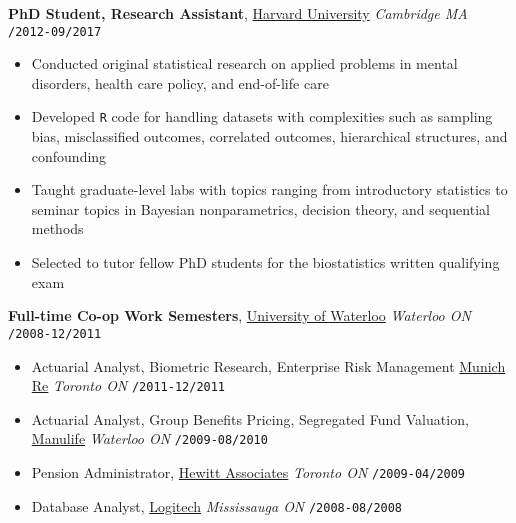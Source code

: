 \documentclass[10pt,english]{report}
\begin{document}
\vspace{1mm}

\textbf{PhD Student, Research Assistant}, \textcolor{blue}{\href{https://gsas.harvard.edu/programs-of-study/all/biostatistics}{Harvard University}} \hfill \textit{Cambridge MA} \texttt{/2012-09/2017}
\begin{itemize}
\item Conducted original statistical research on applied problems in mental disorders, health care policy, and end-of-life care
\item Developed \texttt{R} code for handling datasets with complexities such as sampling bias, misclassified outcomes, correlated outcomes, hierarchical structures, and confounding
\item Taught graduate-level labs with topics ranging from introductory statistics to seminar topics in Bayesian nonparametrics, decision theory, and sequential methods
\item Selected to tutor fellow PhD students for the biostatistics written qualifying exam
\end{itemize}

\vspace{1mm}

\textbf{Full-time Co-op Work Semesters}, \textcolor{blue}{\href{https://uwaterloo.ca/math/}{University of Waterloo}} \hfill \textit{Waterloo ON} \texttt{/2008-12/2011}
\begin{itemize}
\item Actuarial Analyst, Biometric Research, Enterprise Risk Management \textcolor{blue}{\href{https://www.munichre.com/ca}{Munich Re}} \hfill \textit{Toronto ON} \texttt{/2011-12/2011}
\item Actuarial Analyst, Group Benefits Pricing, Segregated Fund Valuation, \textcolor{blue}{\href{https://www.manulife.ca}{Manulife}} \hfill \textit{Waterloo ON} \texttt{/2009-08/2010}
\item Pension Administrator, \textcolor{blue}{\href{http://www.aonhewitt.com}{Hewitt Associates}} \hfill \textit{Toronto ON} \texttt{/2009-04/2009}
\item Database Analyst, \textcolor{blue}{\href{https://www.logitech.com/en-ca}{Logitech}} \hfill \textit{Mississauga ON} \texttt{/2008-08/2008}
\end{itemize}
\end{document}
